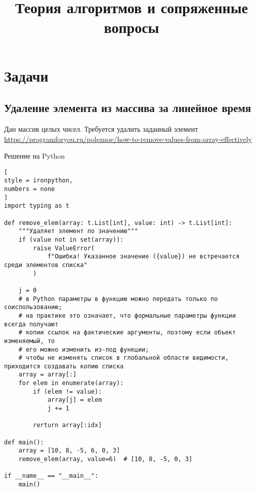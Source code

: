 \documentclass[%
	11pt,
	a4paper,
	utf8,
		]{article}
\begin{document}
\title{Теория алгоритмов и сопряженные вопросы}

\author{}

\date{}
\maketitle

\thispagestyle{fancy}

\tableofcontents

\section{Задачи}

\subsection{Удаление элемента из массива за линейное время}

Дан массив целых чисел. Требуется удалить заданный элемент \url{https://programforyou.ru/poleznoe/how-to-remove-values-from-array-effectively}

Решение на Python
\begin{lstlisting}[
style = ironpython,
numbers = none
]
import typing as t

def remove_elem(array: t.List[int], value: int) -> t.List[int]:
    """Удаляет элемент по значению"""
    if (value not in set(array)):
        raise ValueError(
            f"Ошибка! Указанное значение ({value}) не встречается среди элементов списка"
        )
        
    j = 0
    # в Python параметры в функцию можно передать только по соиспользованию;
    # на практике это означает, что формальные параметры функции всегда получают
    # копии ссылок на фактические аргументы, поэтому если объект изменяемый, то
    # его можно изменить из-под функции;
    # чтобы не изменять список в глобальной области видимости, приходится создавать копию списка
    array = array[:]  
    for elem in enumerate(array):
        if (elem != value):
            array[j] = elem
            j += 1
        
        rerturn array[:idx]
        
def main():
    array = [10, 8, -5, 6, 0, 3]
    remove_elem(array, value=6)  # [10, 8, -5, 0, 3]
    
if __name__ == "__main__":
    main()
\end{lstlisting}




\begin{thebibliography}{99}
\end{thebibliography}


\lstlistoflistings{}
\end{document}
